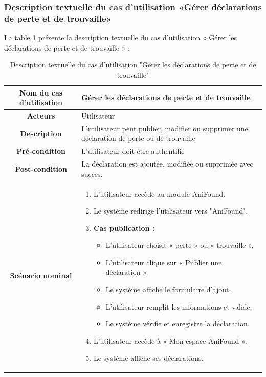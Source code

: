 \subsubsection{Description textuelle du cas d’utilisation «Gérer déclarations de perte et de trouvaille»}
La table \ref{tab:gerer_declarations} présente la description textuelle du cas d’utilisation « Gérer les déclarations de perte et de trouvaille » :
\begin{longtable}{|c|p{11cm}|}
\caption{Description textuelle du cas d'utilisation "Gérer les déclarations de perte et de trouvaille"}
\label{tab:gerer_declarations} \\
\hline
\cellcolor{coloranifound}\textbf{Nom du cas d'utilisation } & Gérer les déclarations de perte et de trouvaille \\
\hline
\cellcolor{coloranifound}\textbf{Acteurs} & Utilisateur \\
\hline
\cellcolor{coloranifound}\textbf{Description } & L’utilisateur peut publier, modifier ou supprimer une déclaration de perte ou de trouvaille \\
\hline
\cellcolor{coloranifound}\textbf{Pré-condition } & L’utilisateur doit être authentifié \\
\hline
\cellcolor{coloranifound}\textbf{Post-condition } & La déclaration est ajoutée, modifiée ou supprimée avec succès. \\
\hline

\cellcolor{coloranifound}\textbf{Scénario nominal } &
\begin{enumerate}
\item L’utilisateur accède au module AniFound.
\item Le système redirige l’utilisateur vers "AniFound".

\item \textbf{Cas publication :}
\begin{itemize}
\item L’utilisateur choisit « perte » ou « trouvaille ».
\item L’utilisateur clique sur « Publier une déclaration ».
\item Le système affiche le formulaire d’ajout.
\item L’utilisateur remplit les informations et valide.
\item Le système vérifie et enregistre la déclaration.
\end{itemize}

\item L’utilisateur accède à « Mon espace AniFound ».
\item Le système affiche ses déclarations.


\end{enumerate}
\end{longtable}
